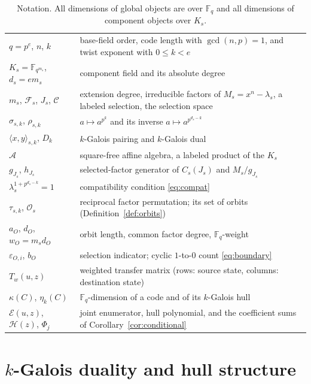 \documentclass[10pt,a4paper]{article}
\newcommand{\F}{\mathbb F}
\newcommand{\A}{\mathcal A}
\newcommand{\Fs}{\mathcal F_s}
\newcommand{\Os}{\mathcal O_s}
\newcommand{\Epoly}{\mathscr E}
\newcommand{\Dk}{D_k}
\numberwithin{equation}{section}
\theoremstyle{plain}
\theoremstyle{definition}
\theoremstyle{remark}
\begin{document}
\begin{table}[t]
\centering
\caption{Notation. All dimensions of global objects are over $\F_q$ and all
dimensions of component objects over $K_s$.}\label{tab:nomenclature}
\small
\begin{tabularx}{\textwidth}{@{}lX@{}}
\toprule
$q=p^{e}$, $n$, $k$ & base-field order, code length with $\gcd(n,p)=1$, and
twist exponent with $0\le k<e$ \\
$K_s=\F_{q^{m_s}}$, $d_s=em_s$ & component field and its absolute degree \\
$m_s$, $\Fs$, $J_s$, $\mathscr C$ & extension degree, irreducible factors of
$M_s=x^n-\lambda_s$, a labeled selection, the selection space \\
$\sigma_{s,k}$, $\rho_{s,k}$ & $a\mapsto a^{p^{k}}$ and its inverse
$a\mapsto a^{p^{d_s-k}}$ \\
$\langle x,y\rangle_{s,k}$, $\Dk$ & $k$-Galois pairing and $k$-Galois dual \\
$\A$ & square-free affine algebra, a labeled product of the $K_s$ \\
$g_{J_s}$, $h_{J_s}$ & selected-factor generator of $C_s(J_s)$ and
$M_s/g_{J_s}$ \\
$\lambda_s^{1+p^{d_s-k}}=1$ & compatibility condition \eqref{eq:compat} \\
$\tau_{s,k}$, $\Os$ & reciprocal factor permutation; its set of orbits
(Definition~\ref{def:orbits}) \\
$a_O$, $d_O$, $w_O=m_sd_O$ & orbit length, common factor degree, $\F_q$-weight \\
$\varepsilon_{O,i}$, $b_O$ & selection indicator; cyclic $1$-to-$0$ count
\eqref{eq:boundary} \\
$T_w(u,z)$ & weighted transfer matrix (rows: source state, columns: destination
state) \\
$\kappa(C)$, $\eta_k(C)$ & $\F_q$-dimension of a code and of its $k$-Galois hull \\
$\Epoly(u,z)$, $\mathcal H(z)$, $\Phi_j$ & joint enumerator, hull polynomial,
and the coefficient sums of Corollary~\ref{cor:conditional} \\
\bottomrule
\end{tabularx}
\end{table}

\section{\texorpdfstring{$k$}{k}-Galois duality and hull structure}\label{sec:duality}
\end{document}
